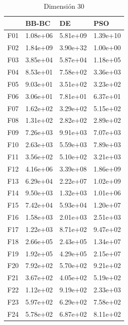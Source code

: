 \begin{table}[H]
\begin{minipage}{.5\linewidth}
    \end{minipage}%
    \begin{minipage}{.5\linewidth}
      \centering
        \caption{Dimensión 30}
        \begin{tabular}{llll}
            \toprule
            {} &     BB-BC &        DE &       PSO \\
            \midrule
            F01  &  1.08e+06 &  5.81e+09 &  1.39e+10 \\
            F02  &  1.84e+09 &  3.90e+32 &  1.00e+00 \\
            F03  &  3.85e+04 &  5.87e+04 &  1.18e+05 \\
            F04  &  8.53e+01 &  7.58e+02 &  3.36e+03 \\
            F05  &  9.03e+01 &  3.51e+02 &  3.23e+02 \\
            F06  &  3.06e+01 &  7.81e+01 &  6.37e+01 \\
            F07  &  1.62e+02 &  3.29e+02 &  5.15e+02 \\
            F08  &  1.31e+02 &  2.82e+02 &  2.89e+02 \\
            F09  &  7.26e+03 &  9.91e+03 &  7.07e+03 \\
            F10  &  2.63e+03 &  5.59e+03 &  7.89e+03 \\
            F11  &  3.56e+02 &  5.10e+02 &  3.21e+03 \\
            F12  &  4.16e+06 &  3.39e+08 &  1.86e+09 \\
            F13  &  6.29e+04 &  2.22e+07 &  1.02e+09 \\
            F14  &  9.50e+03 &  1.32e+03 &  1.01e+06 \\
            F15  &  7.42e+04 &  5.93e+04 &  1.20e+07 \\
            F16  &  1.58e+03 &  2.01e+03 &  2.51e+03 \\
            F17  &  1.22e+03 &  8.71e+02 &  9.47e+02 \\
            F18  &  2.66e+05 &  2.43e+05 &  1.34e+07 \\
            F19  &  1.92e+05 &  4.29e+05 &  2.15e+07 \\
            F20  &  7.92e+02 &  5.70e+02 &  9.21e+02 \\
            F21  &  3.67e+02 &  4.05e+02 &  5.19e+02 \\
            F22  &  1.12e+02 &  9.19e+02 &  2.33e+03 \\
            F23  &  5.97e+02 &  6.29e+02 &  7.58e+02 \\
            F24  &  5.78e+02 &  6.87e+02 &  8.11e+02 \\

\end{tabular}
\end{minipage}
\end{table}
